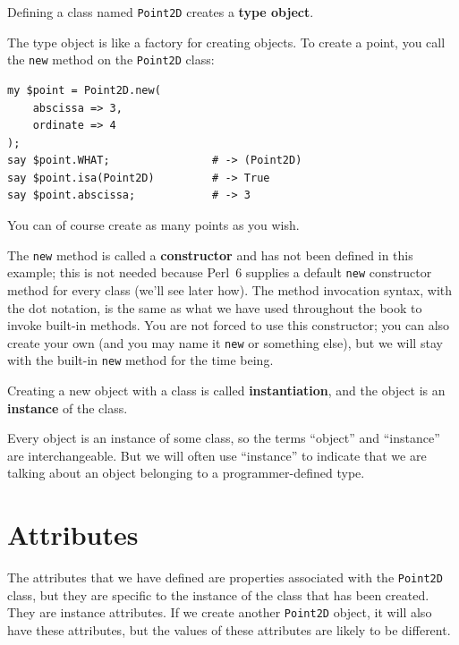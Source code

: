 Defining a class named {\tt Point2D} creates a {\bf type object}.

The type object is like a factory for creating objects.  To create 
a point, you call the {\tt new} method on the {\tt Point2D} class:

\begin{verbatim}
my $point = Point2D.new( 
    abscissa => 3, 
    ordinate => 4
);
say $point.WHAT;                # -> (Point2D)
say $point.isa(Point2D)         # -> True
say $point.abscissa;            # -> 3
\end{verbatim}
%
You can of course create as many points as you wish.

The {\tt new} method is called a {\bf constructor} and has not 
been defined in this example; this is not needed because 
Perl~6 supplies a default {\tt new} constructor method for 
every class (we'll see later how). The method invocation 
syntax, with the dot notation, is the same as what we have 
used throughout the book to invoke built-in methods. You 
are not forced to use this constructor; you can also create 
your own (and you may name it {\tt new} or something else), 
but we will stay with the built-in {\tt new} method for the 
time being.

Creating a new object with a class is called {\bf instantiation}, 
and the object is an {\bf instance} of the class.

Every object is an instance of some class, so the terms 
``object'' and ``instance'' are interchangeable.  But 
we will often use ``instance'' to indicate that we are 
talking about an object belonging to a programmer-defined type.

\section{Attributes}
\label{attributes}

The attributes that we have defined are properties associated 
with the {\tt Point2D} class, but they are specific to the 
instance of the class that has been created. They are 
instance attributes. If we create another {\tt Point2D} object, 
it will also have these attributes, but the values of 
these attributes are likely to be different. 

